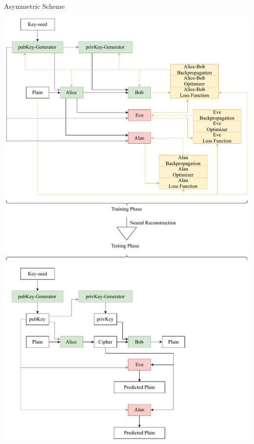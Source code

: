 \documentclass[a4paper, 12pt]{report}
\begin{document}
\begin{inlinefigure}{ Asymmetric Scheme}
	\begin{center}
		\includegraphics[width = \textwidth, height = 0.98\textheight]{asymmetricScheme}
	\end{center}
\end{inlinefigure}
\newpage
\end{document}

